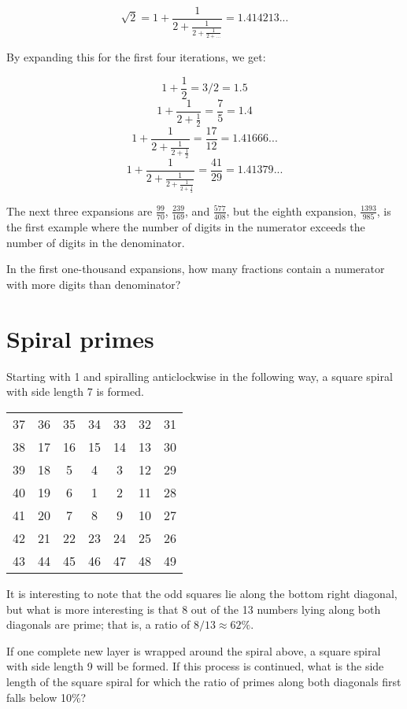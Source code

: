 $$\sqrt{2} = 1 + \frac{1}{2 + \frac{1}{2 + \frac{1}{2 + ...}}} = 1.414213...$$

By expanding this for the first four iterations, we get:

$$1 + \frac{1}{2} = 3/2 = 1.5$$
$$1 + \frac{1}{2 + \frac{1}{2}} = \frac{7}{5} = 1.4$$
$$1 + \frac{1}{2 + \frac{1}{2 + \frac{1}{2}}} = \frac{17}{12} = 1.41666...$$
$$1 + \frac{1}{2 + \frac{1}{2 + \frac{1}{2 + \frac{1}{2}}}} = \frac{41}{29} = 1.41379...$$

The next three expansions are $\frac{99}{70}$, $\frac{239}{169}$, and $\frac{577}{408}$, but the eighth expansion, $\frac{1393}{985}$, is the first example where the number of digits in the numerator exceeds the number of digits in the denominator.

In the first one-thousand expansions, how many fractions contain a numerator with more digits than denominator?

\section{Spiral primes} \label{pb.058}

Starting with 1 and spiralling anticlockwise in the following way, a square spiral with side length 7 is formed.

\begin{center}
    \begin{tabular}{ccccccc}
        37 & 36 & 35 & 34 & 33 & 32 & 31\\
        38 & 17 & 16 & 15 & 14 & 13 & 30\\
        39 & 18 &  5 &  4 &  3 & 12 & 29\\
        40 & 19 &  6 &  1 &  2 & 11 & 28\\
        41 & 20 &  7 &  8 &  9 & 10 & 27\\
        42 & 21 & 22 & 23 & 24 & 25 & 26\\
        43 & 44 & 45 & 46 & 47 & 48 & 49\\
    \end{tabular}
\end{center}

It is interesting to note that the odd squares lie along the bottom right diagonal, but what is more interesting is that 8 out of the 13 numbers lying along both diagonals are prime; that is, a ratio of $8/13 ≈ 62\%$.

If one complete new layer is wrapped around the spiral above, a square spiral with side length 9 will be formed. If this process is continued, what is the side length of the square spiral for which the ratio of primes along both diagonals first falls below 10\%?

